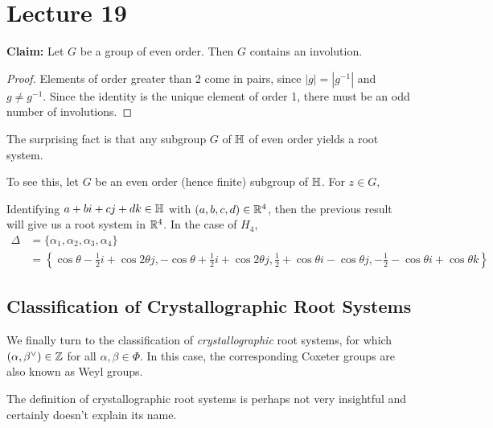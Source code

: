 \section{Lecture 19}

{\bf Claim:} Let $G$ be a group of even order. Then $G$ contains an involution.

\begin{proof}
Elements of order greater than 2 come in pairs, since $|g| = |g^{-1}|$ and
$g \neq g^{-1}$.
Since the identity is the unique element of order 1, there must be an odd
number of involutions.
\end{proof}

The surprising fact is that any subgroup $G$ of $\mathbb{H}$ of even order yields a
root system.

To see this, let $G$ be an even order (hence finite) subgroup of $\mathbb{H}$. For
$z \in G$,


Identifying $a+bi+cj+dk \in \mathbb{H}$ with $(a,b,c,d) \in \mathbb{R}^4$, then the previous
result will give us a root system in $\mathbb{R}^4$. In the case of $H_4$,
\begin{align*} %
    \Delta &= \{\alpha_1, \alpha_2, \alpha_3, \alpha_4\} \\
    &= \left\{
        \cos \theta - \frac{1}{2} i + \cos 2\theta j,
        -\cos \theta + \frac{1}{2} i + \cos 2\theta j,
        \frac{1}{2} + \cos \theta i - \cos \theta j,
        -\frac{1}{2} - \cos \theta i + \cos \theta k
    \right\}
\end{align*}

\subsection{Classification of Crystallographic Root Systems}

We finally turn to the classification of {\em crystallographic} root systems,
for which $(\alpha, \beta^\vee) \in \mathbb{Z}$ for all $\alpha, \beta \in \Phi$.
In this case, the corresponding Coxeter groups are also known as Weyl groups.

The definition of crystallographic root systems is perhaps not very insightful
and certainly doesn't explain its name.

